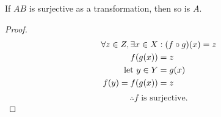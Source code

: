 \begin{question}
	If $AB$ is surjective as a transformation, then so is $A$.

	\begin{proof}
		\begin{align*}
			\forall z \in Z, \exists x \in X            & : (f\circ g)(x) = z \\
			f(g(x))                                     & = z                 \\
			{\text{let } } y\in Y                                & = g(x)              \\
			f(y)                              = f(g(x)) & = z                 \\
		\end{align*}
		$$ \therefore f \text{ is surjective.} $$
	\end{proof}
\end{question}

